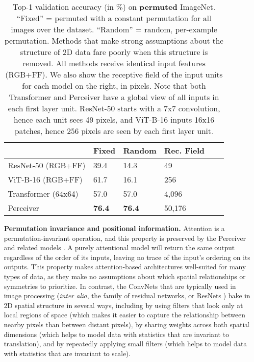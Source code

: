 \documentclass{article}
\begin{document}
\begin{table}[t]
\centering
\begin{tabular}{|l|l|l|l|l|l|}
\hline
                                       & Fixed          & Random    & Rec. Field   \\ \hline
ResNet-50 (RGB+FF)                     & 39.4           & 14.3      &  49  \\ 
ViT-B-16 (RGB+FF)                      & 61.7           & 16.1      &  256  \\ 
Transformer (64x64)                    & 57.0           & 57.0      &  4,096  \\ \hline
Perceiver                              &  \textbf{76.4} & \textbf{76.4} & 50,176 \\ \hline
\end{tabular}
\vspace{-8pt}
\caption{Top-1 validation accuracy (in \%) on \textbf{permuted} ImageNet. ``Fixed'' = permuted with a constant permutation for all images over the dataset. ``Random'' = random, per-example permutation. Methods that make strong assumptions about the structure of 2D data fare poorly when this structure is removed. All methods receive identical input features (RGB+FF). We also show the receptive field of the input units for each model on the right, in pixels. Note that both Transformer and Perceiver have a global view of all inputs in each first layer unit. ResNet-50 starts with a 7x7 convolution, hence each unit sees 49 pixels, and ViT-B-16 inputs 16x16 patches, hence 256 pixels are seen by each first layer unit.}
\label{tab:imagenet_permuted}
\vspace{-12pt}
\end{table}


\noindent \textbf{Permutation invariance and positional information.} Attention is a permutation-invariant operation, and this property is preserved by the Perceiver and related models \cite{lee2019set}. A purely attentional model will return the same output regardless of the order of its inputs, leaving no trace of the input's ordering on its outputs. This property makes attention-based architectures well-suited for many types of data, as they make no assumptions about which spatial relationships or symmetries to prioritize. In contrast, the ConvNets that are typically used in image processing (\textit{inter alia}, the family of residual networks, or ResNets \cite{he2016deep}) bake in 2D spatial structure in several ways, including by using filters that look only at local regions of space (which makes it easier to capture the relationship between nearby pixels than between distant pixels), by sharing weights across both spatial dimensions (which helps to model data with statistics that are invariant to translation), and by repeatedly applying small filters (which helps to model data with statistics that are invariant to scale).
\end{document}

